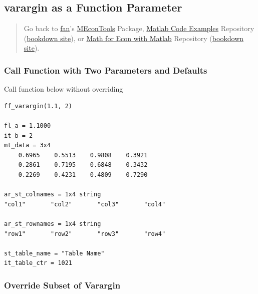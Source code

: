 \documentclass[
]{book}
\begin{document}
\hypertarget{varargin-as-a-function-parameter}{%
\subsection{varargin as a Function Parameter}\label{varargin-as-a-function-parameter}}

\begin{quote}
Go back to \href{http://fanwangecon.github.io/}{fan}'s \href{https://fanwangecon.github.io/MEconTools/}{MEconTools} Package, \href{https://fanwangecon.github.io/M4Econ/}{Matlab Code Examples} Repository (\href{https://fanwangecon.github.io/M4Econ/bookdown}{bookdown site}), or \href{https://fanwangecon.github.io/Math4Econ/}{Math for Econ with Matlab} Repository (\href{https://fanwangecon.github.io/Math4Econ/bookdown}{bookdown site}).
\end{quote}

\hypertarget{call-function-with-two-parameters-and-defaults}{%
\subsubsection{Call Function with Two Parameters and Defaults}\label{call-function-with-two-parameters-and-defaults}}

Call function below without overriding

\begin{verbatim}
ff_varargin(1.1, 2)

fl_a = 1.1000
it_b = 2
mt_data = 3x4    
    0.6965    0.5513    0.9808    0.3921
    0.2861    0.7195    0.6848    0.3432
    0.2269    0.4231    0.4809    0.7290

ar_st_colnames = 1x4 string    
"col1"       "col2"       "col3"       "col4"       

ar_st_rownames = 1x4 string    
"row1"       "row2"       "row3"       "row4"       

st_table_name = "Table Name"
it_table_ctr = 1021
\end{verbatim}

\hypertarget{override-subset-of-varargin}{%
\subsubsection{Override Subset of Varargin}\label{override-subset-of-varargin}}
\end{document}
